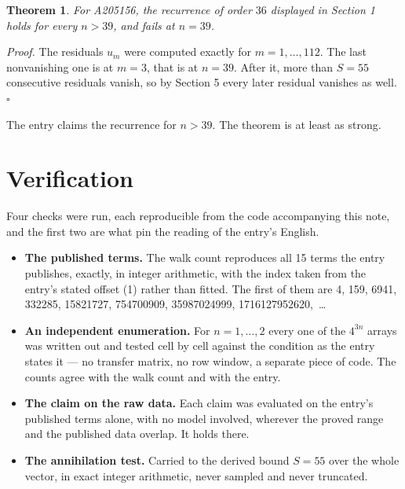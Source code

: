 \documentclass[11pt]{article}
\newtheorem{theorem}{Theorem}
\theoremstyle{definition}
\begin{document}
\begin{theorem} For A205156, the recurrence of order $36$ displayed in Section 1 holds for every $n > 39$, and fails at $n = 39$.\end{theorem}

{\itshape Proof.} The residuals $u_m$ were computed exactly for $m = 1,\dots,112$. The last nonvanishing one is at $m = 3$, that is at $n = 39$. After it, more than $S = 55$ consecutive residuals vanish, so by Section 5 every later residual vanishes as well. $\square$

The entry claims the recurrence for $n > 39$. The theorem is at least as strong.

\section{Verification}

Four checks were run, each reproducible from the code accompanying this note, and the first two are what pin the reading of the entry's English.

\begin{itemize}

\item {\bfseries The published terms.} The walk count reproduces all 15 terms the entry publishes, exactly, in integer arithmetic, with the index taken from the entry's stated offset (1) rather than fitted. The first of them are 4, 159, 6941, 332285, 15821727, 754700909, 35987024999, 1716127952620,~\dots

\item {\bfseries An independent enumeration.} For $n = 1,\dots,2$ every one of the $4^{3n}$ arrays was written out and tested cell by cell against the condition as the entry states it --- no transfer matrix, no row window, a separate piece of code. The counts agree with the walk count and with the entry.

\item {\bfseries The claim on the raw data.} Each claim was evaluated on the entry's published terms alone, with no model involved, wherever the proved range and the published data overlap. It holds there.

\item {\bfseries The annihilation test.} Carried to the derived bound $S = 55$ over the whole vector, in exact integer arithmetic, never sampled and never truncated.

\end{itemize}
\end{document}
